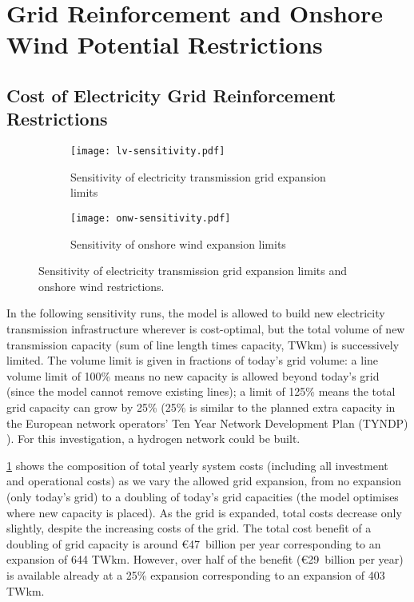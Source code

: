 \section{Grid Reinforcement and Onshore Wind Potential Restrictions}
\label{sec:si:sensitivity-lv-onw}

\subsection{Cost of Electricity Grid Reinforcement Restrictions}
\label{sec:si:lv}

\begin{figure}
    \centering
    \begin{subfigure}[t]{\textwidth}
        \centering
        \caption{Sensitivity of electricity transmission grid expansion limits}
        \texttt{[image: lv-sensitivity.pdf]}
        \label{fig:lv-restriction}
    \end{subfigure}
    \begin{subfigure}[t]{\textwidth}
        \centering
        \caption{Sensitivity of onshore wind expansion limits}
        \texttt{[image: onw-sensitivity.pdf]}
        \label{fig:onw-restriction}
    \end{subfigure}
    \caption{Sensitivity of electricity transmission grid expansion limits and onshore wind restrictions.}
    \label{fig:lv-onw-restriction}
\end{figure}

In the following sensitivity runs, the model is allowed to build new electricity
transmission infrastructure wherever is cost-optimal, but the total volume of
new transmission capacity (sum of line length times capacity, TWkm) is
successively limited. The volume limit is given in fractions of today's grid
volume: a line volume limit of 100\% means no new capacity is allowed beyond
today's grid (since the model cannot remove existing lines); a limit of 125\%
means the total grid capacity can grow by 25\% (25\% is similar to the planned
extra capacity in the European network operators' Ten Year Network Development
Plan (TYNDP) \cite{TYNDP2016}). For this investigation, a hydrogen network
could be built.

\cref{fig:lv-restriction} shows the composition of total yearly system costs
(including all investment and operational costs) as we vary the allowed grid
expansion, from no expansion (only today's grid) to a doubling of today's grid
capacities (the model optimises where new capacity is placed). As the grid is
expanded, total costs decrease only slightly, despite the increasing costs of
the grid. The total cost benefit of a doubling of grid capacity is around
\euro47~billion per year corresponding to an expansion of 644 TWkm. However, over
half of the benefit (\euro29~billion per year) is available already at a 25\%
expansion corresponding to an expansion of 403 TWkm.

